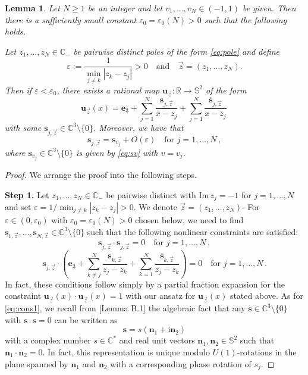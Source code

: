 \documentclass[11pt,reqno]{amsart}
\newtheorem{lem}{Lemma}[section]
\theoremstyle{definition}
\theoremstyle{remark}
\theoremstyle{remark}
\numberwithin{equation}{section}
\newcommand{\C}{\mathbb{C}}
\newcommand{\R}{\mathbb{R}}
\newcommand{\Ss}{\mathbb{S}}
\newcommand{\ov}{\overline}
\newcommand{\sv}{\mathbf{s}}
\newcommand{\nv}{\mathbf{n}}
\newcommand{\be}{\begin{equation}}
\newcommand{\ee}{\end{equation}}
\newcommand{\eps}{\varepsilon}
\newcommand{\ii}{\mathrm{i}}
\renewcommand{\Im}{\mathrm{Im}}
\newcommand{\uu}{\mathbf{u}}
\begin{document}
\begin{appendix}
\begin{lem} \label{lem:flea_circus}
Let $N \geq 1$ be an integer and let $v_1, \ldots, v_N \in (-1,1)$ be given. Then there is a sufficiently small constant $\eps_0=\eps_0(N) > 0$ such that the following holds.

Let $z_1, \ldots, z_N \in \C_-$ be pairwise distinct poles of the form \eqref{eq:pole} and define
$$
\eps := \frac{1}{\min_{j \neq k} |z_k -z_j|} > 0 \quad \mbox{and} \quad \vec{z} = (z_1, \ldots, z_N).
$$ 
Then if $\eps < \eps_0$, there exists a rational map $\uu_{\vec{z}} : \R \to \Ss^2$ of the form
$$
\uu_{\vec{z}}(x) = \mathbf{e}_3 + \sum_{j=1}^N \frac{\sv_{j,\vec{z}}}{x-z_j} + \sum_{j=1}^N \frac{\ov{\sv}_{j,\vec{z}}}{x- \ov{z}_j} \, 
$$ 
with some $\sv_{j,\vec{z}} \in \C^3 \setminus \{ 0 \}$. Moreover, we have that
$$
 \sv_{j,\vec{z}} = \sv_{v_j} + O(\eps) \quad \mbox{for $j=1, \ldots, N$} \, ,
$$
where $\sv_{v_j} \in \C^3 \setminus \{0\}$ is given by \eqref{eq:sv} with $v=v_j$. 
\end{lem}


\begin{proof}
We arrange the proof into the following steps.

\medskip
\textbf{Step 1.} Let $z_1, \ldots, z_N \in \C_-$ be pairwise distinct with $\Im \, z_j = -1$ for $j=1, \ldots, N$ and set $\eps = 1/{\min_{j \neq k}|z_k-z_j|} > 0$. We denote $\vec{z} = (z_1, \ldots, z_N)$- For $\eps \in (0, \eps_0)$ with $\eps_0=\eps_0(N) > 0$ chosen below, we need to find $\sv_{1, \vec{z}}, \ldots, \sv_{N, \vec{z}} \in \C^3 \setminus \{ 0 \}$ such that the following nonlinear constraints are satisfied:
\be \label{eq:cons1}
\sv_{j,\vec{z}} \cdot \sv_{j,\vec{z}} = 0 \quad \mbox{for $j=1, \ldots, N$} \, ,
\ee
\be \label{eq:cons2}
\sv_{j,\vec{z}} \cdot \left (  \mathbf{e}_3 + \sum_{k \neq j}^N \frac{\sv_{k,\vec{z}}}{z_j - z_k} + \sum_{k=1}^N \frac{\ov{\sv}_{k,\vec{z}}}{z_j-\ov{z}_k} \right ) = 0 \quad \mbox{for $j=1, \ldots, N$} \, .
\ee
In fact, these conditions follow simply by a partial fraction expansion for the constraint $\uu_{\vec{z}}(x) \cdot \uu_{\vec{z}}(x) = 1$ with our ansatz for $\uu_{\vec{z}}(x)$ stated above.  As for \eqref{eq:cons1}, we recall from \cite{BeKlLa-20}[Lemma B.1] the algebraic fact that any $\sv \in \C^3 \setminus \{ 0 \}$ with $\sv \cdot \sv = 0$ can be written as
$$
\sv = s ( \nv_1 + \ii \nv_2)
$$
with a complex number $s \in \C^*$ and real unit vectors $\nv_1, \nv_2 \in \Ss^2$ such that $\nv_1 \cdot \nv_2 = 0$. In fact, this representation is unique modulo $U(1)$-rotations in the plane spanned by $\nv_1$ and $\nv_2$ with a corresponding phase rotation of $s_j$. 


\end{proof}
\end{appendix}
\end{document}
